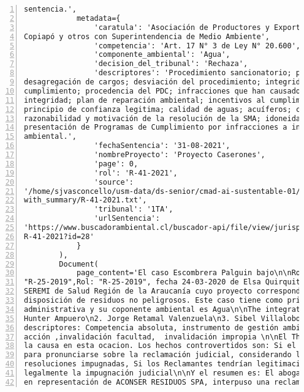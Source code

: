 \begin{Verbatim}[frame=lines, label=Elavoración propia -  Ejemplo de Contexto enviado por el Chatbot a OpenAI
				, fontsize=\footnotesize, numbers=left
				, baselinestretch=0.4
				, formatcom=\color{gray}]
sentencia.',
            metadata={
                'caratula': 'Asociación de Productores y Exportadores Agrícolas del Valle de
Copiapó y otros con Superintendencia de Medio Ambiente',
                'competencia': 'Art. 17 N° 3 de Ley N° 20.600',
                'componente_ambiental': 'Agua',
                'decision_del_tribunal': 'Rechaza',
                'descriptores': 'Procedimiento sancionatorio; programa de cumplimiento; SMA;
desagregación de cargos; desviación del procedimiento; integridad del programa de
cumplimiento; procedencia del PDC; infracciones que han causado daño ambiental; criterio de
integridad; plan de reparación ambiental; incentivos al cumplimiento; falta de perjuicio;
principio de confianza legitima; calidad de aguas; acuíferos; criterio de eficacia;
razonabilidad y motivación de la resolución de la SMA; idoneidad de las medidas; Guía para la
presentación de Programas de Cumplimiento por infracciones a instrumentos de carácter
ambiental.',
                'fechaSentencia': '31-08-2021',
                'nombreProyecto': 'Proyecto Caserones',
                'page': 0,
                'rol': 'R-41-2021',
                'source':
'/home/sjvasconcello/usm-data/ds-senior/cmad-ai-sustentable-01/etl/load/../../data/clean/docs_
with_summary/R-41-2021.txt',
                'tribunal': '1TA',
                'urlSentencia':
'https://www.buscadorambiental.cl/buscador-api/file/view/jurisprudencia/S1TA Rol N°
R-41-2021?id=28'
            }
        ),
        Document(
            page_content='El caso Escombrera Palguin bajo\n\nRol: "R-25-2019", Rol:
"R-25-2019",Rol: "R-25-2019", fecha 24-03-2020 de Elsa Quirquitripay Antiman y Otros con
SEREMI de Salud Región de la Araucanía cuyo proyecto corresponde a Escombrera, sitio de
disposición de residuos no peligrosos. Este caso tiene como principal materia Invalidación
administrativa y su coponente ambiental es Agua\n\nThe integration ministers are: \n1. Iván
Hunter Ampuero\n2. Jorge Retamal Valenzuela\n3. Sibel Villalobos Volpi\n\nSiendo sus
descriptores: Competencia absoluta, instrumento de gestión ambiental, legitimación activa,
acción ,invalidación facultad,  invalidación impropia \n\nEl Third Environmental Court Rechaza
la causa en esta ocacion. Los hechos controvertidos son: Si el Tribunal tendría competencia
para pronunciarse sobre la reclamación judicial, considerando la naturaleza de las
resoluciones impugnadas, Si los Reclamantes tendrían legitimación activa para ejercer
legalmente la impugnación judicial\n\nY el resumen es: El abogado Marco Antonio Román Cordero,
en representación de ACONSER RESIDUOS SPA, interpuso una reclamación contra la

\end{Verbatim}

